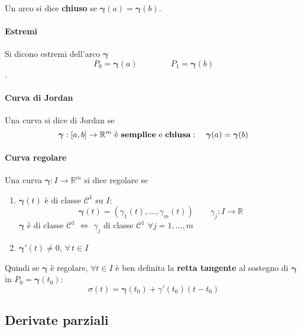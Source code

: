 \documentclass[x11names]{article}
\begin{document}
	Un arco si dice \textbf{chiuso} se \(\boldsymbol{\gamma}(a) = \boldsymbol{\gamma}(b)\).
	\paragraph{Estremi} Si dicono estremi dell'arco \(\boldsymbol{\gamma}\)
	\[
	P_0 = \boldsymbol{\gamma}(a) \qquad \qquad P_1 = \boldsymbol{\gamma}(b) 
	\].
	\paragraph{Curva di Jordan}
	Una curva si dice di Jordan se 
	\[
	\boldsymbol{\gamma}:[a,b] \to \mathbb{R}^m \text{ è \textbf{semplice} e \textbf{chiusa}}: \quad \boldsymbol{\gamma}(a) = \boldsymbol{\gamma}(b)
	\]
	\paragraph{Curva regolare} Una curva \(\boldsymbol{\gamma}:I\to\mathbb{R}^m\) si dice regolare  se
	\begin{enumerate}
		\item \(\boldsymbol{\gamma}(t)\) è di classe \(\mathcal{C}^1\) su \(I\):
		\[
		\boldsymbol{\gamma}(t) = \left(\gamma_1(t),\dots,\gamma_m(t)\right) \qquad \gamma_j:I\to\mathbb{R}
		\]
		\(\boldsymbol{\gamma}\) è di classe \(\mathcal{C}^1\) \(\Longleftrightarrow\) \(\gamma_j\) di classe \(\mathcal{C}^1\) \(\forall j = 1,\dots,m\)
		\item \(\boldsymbol{\gamma'}(t) \neq 0\), \(\forall \,t \in I\)
	\end{enumerate}
	Quindi se \(\boldsymbol{\gamma}\) è regolare, \(\forall t \in I\) è ben definita la \textbf{retta tangente} al sostegno di \(\boldsymbol{\gamma}\) in \(P_{0} = \boldsymbol{\gamma}(t_{0})\):
	\[ 
	\sigma (t) = \boldsymbol{\gamma}(t_{0}) + \gamma'(t_{0})(t-t_{0})
	\]
	
	
	\subsection{Derivate parziali}
\end{document}
